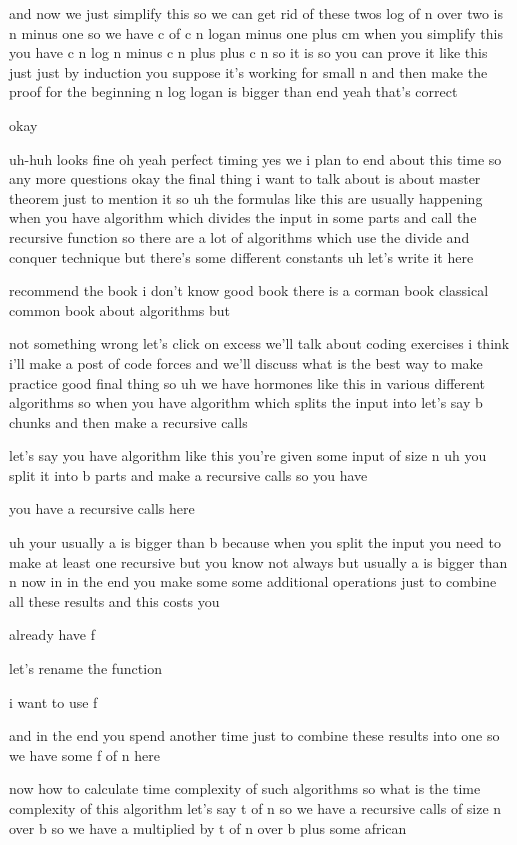 and now we just simplify this so we can get rid of these twos log of n over two is n minus one so we have c of c n logan minus one plus cm when you simplify this you have c n log n minus c n plus plus c n so it is so you can prove it like this just just by induction you suppose it's working for small n and then make the proof for the beginning n log logan is bigger than end yeah that's correct

okay

uh-huh looks fine oh yeah perfect timing yes we i plan to end about this time so any more questions okay the final thing i want to talk about is about master theorem just to mention it so uh the formulas like this are usually happening when you have algorithm which divides the input in some parts and call the recursive function so there are a lot of algorithms which use the divide and conquer technique but there's some different constants uh let's write it here

recommend the book i don't know good book there is a corman book classical common book about algorithms but

not something wrong let's click on excess we'll talk about coding exercises i think i'll make a post of code forces and we'll discuss what is the best way to make practice good final thing so uh we have hormones like this in various different algorithms so when you have algorithm which splits the input into let's say b chunks and then make a recursive calls

let's say you have algorithm like this you're given some input of size n uh you split it into b parts and make a recursive calls so you have

you have a recursive calls here

uh your usually a is bigger than b because when you split the input you need to make at least one recursive but you know not always but usually a is bigger than n now in in the end you make some some additional operations just to combine all these results and this costs you

already have f

let's rename the function

i want to use f

and in the end you spend another time just to combine these results into one so we have some f of n here

now how to calculate time complexity of such algorithms so what is the time complexity of this algorithm let's say t of n so we have a recursive calls of size n over b so we have a multiplied by t of n over b plus some african

